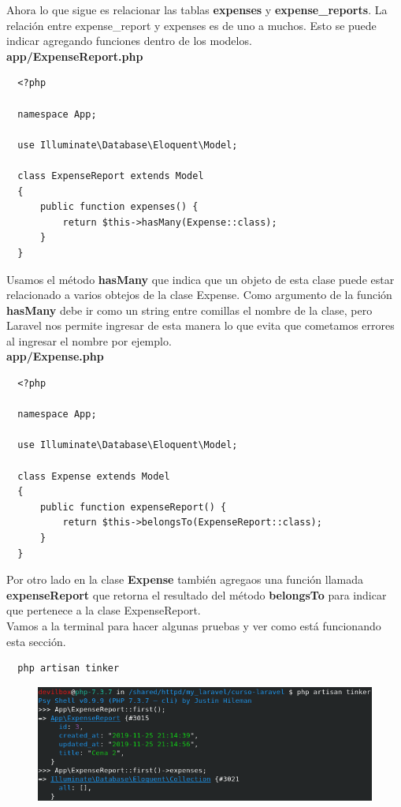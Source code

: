 \documentclass{article}
\begin{document}
\newpage

Ahora lo que sigue es relacionar las tablas \textbf{expenses} y
\textbf{expense\_reports}. La relación entre expense\_report y expenses es de
uno a muchos. Esto se puede indicar agregando funciones dentro de los
modelos.\\

\textbf{app/ExpenseReport.php}
\begin{verbatim}
  <?php

  namespace App;

  use Illuminate\Database\Eloquent\Model;

  class ExpenseReport extends Model
  {
      public function expenses() {
          return $this->hasMany(Expense::class);
      }
  }
\end{verbatim}

Usamos el método \textbf{hasMany} que indica que un objeto de esta clase puede
estar relacionado a varios obtejos de la clase Expense. Como argumento de la
función \textbf{hasMany} debe ir como un string entre comillas el nombre de la
clase, pero Laravel nos permite ingresar de esta manera lo que evita que
cometamos errores al ingresar el nombre por ejemplo.\\

\textbf{app/Expense.php}
\begin{verbatim}
  <?php

  namespace App;

  use Illuminate\Database\Eloquent\Model;

  class Expense extends Model
  {
      public function expenseReport() {
          return $this->belongsTo(ExpenseReport::class);
      }
  }
\end{verbatim}

Por otro lado en la clase \textbf{Expense} también agregaos una función llamada
\textbf{expenseReport} que retorna el resultado del método \textbf{belongsTo}
para indicar que pertenece a la clase ExpenseReport.\\

Vamos a la terminal para hacer algunas pruebas y ver como está funcionando
esta sección.\\

\begin{verbatim}
  php artisan tinker
\end{verbatim}

\begin{figure}[h!]
  \centering
  \includegraphics[scale=0.75]{./Pictures/106_tinker.png}
\end{figure}
\end{document}
